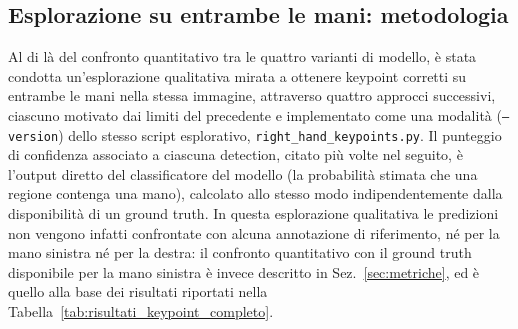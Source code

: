 \subsection{Esplorazione su entrambe le mani: metodologia}
\label{sec:esplorazione_dx_metodo}

Al di là del confronto quantitativo tra le quattro varianti di modello,
è stata condotta un'esplorazione qualitativa mirata a ottenere keypoint
corretti su entrambe le mani nella stessa immagine, attraverso quattro
approcci successivi, ciascuno motivato dai limiti del precedente e
implementato come una modalità (\texttt{--version}) dello stesso script
esplorativo, \texttt{right\_hand\_keypoints.py}. Il punteggio di
confidenza associato a ciascuna detection, citato più
volte nel seguito, è l'output diretto del classificatore del modello
(la probabilità stimata che una regione contenga una mano), calcolato
allo stesso modo indipendentemente dalla disponibilità di un ground
truth. In questa esplorazione qualitativa le predizioni non vengono
infatti confrontate con alcuna annotazione di riferimento, né per la
mano sinistra né per la destra: il confronto quantitativo con il
ground truth disponibile per la mano sinistra è invece descritto in
Sez.~\ref{sec:metriche}, ed è quello alla base dei risultati riportati
nella Tabella~\ref{tab:risultati_keypoint_completo}.


